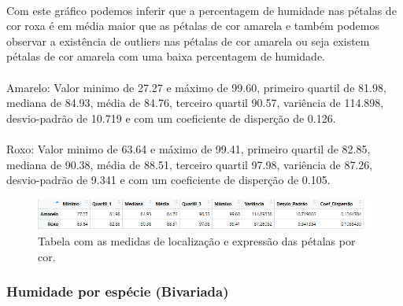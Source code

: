 \documentclass{article}
\begin{document}
\paragraph{} Com este gráfico podemos inferir que a percentagem de humidade nas pétalas de cor roxa é em média maior que as pétalas de cor amarela e também podemos observar a existência de outliers nas pétalas de cor amarela ou seja existem pétalas de cor amarela com uma baixa percentagem de humidade.

\paragraph{} Amarelo: Valor minimo de 27.27 e máximo de 99.60, primeiro quartil de 81.98, mediana de 84.93, média de 84.76,  terceiro quartil 90.57, variência de 114.898, desvio-padrão de 10.719 e com um coeficiente de disperção de 0.126.

\paragraph{} Roxo: Valor minimo de 63.64 e máximo de 99.41, primeiro quartil de 82.85, mediana de 90.38, média de 88.51,  terceiro quartil 97.98, variência de 87.26, desvio-padrão de 9.341 e com um coeficiente de disperção de 0.105.

\begin{figure}[h]
       \centering %
        \includegraphics[scale=0.8]{tabela_humidade_cor.png}
       \caption{Tabela com as medidas de localização e expressão das pétalas por cor.}
       \label{fig:logo}
    \end{figure}
    
\paragraph{}


\subsubsection{Humidade por espécie (Bivariada)}
\end{document}
